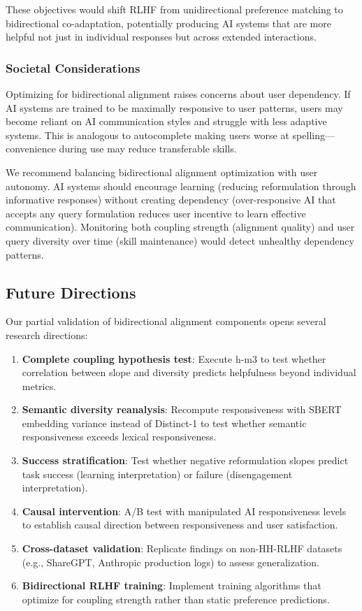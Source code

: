 These objectives would shift RLHF from unidirectional preference matching to bidirectional co-adaptation, potentially producing AI systems that are more helpful not just in individual responses but across extended interactions.

\subsubsection{Societal Considerations}

Optimizing for bidirectional alignment raises concerns about user dependency. If AI systems are trained to be maximally responsive to user patterns, users may become reliant on AI communication styles and struggle with less adaptive systems. This is analogous to autocomplete making users worse at spelling---convenience during use may reduce transferable skills.

We recommend balancing bidirectional alignment optimization with user autonomy. AI systems should encourage learning (reducing reformulation through informative responses) without creating dependency (over-responsive AI that accepts any query formulation reduces user incentive to learn effective communication). Monitoring both coupling strength (alignment quality) and user query diversity over time (skill maintenance) would detect unhealthy dependency patterns.

\subsection{Future Directions}

Our partial validation of bidirectional alignment components opens several research directions:

\begin{enumerate}
\item \textbf{Complete coupling hypothesis test}: Execute h-m3 to test whether correlation between slope and diversity predicts helpfulness beyond individual metrics.

\item \textbf{Semantic diversity reanalysis}: Recompute responsiveness with SBERT embedding variance instead of Distinct-1 to test whether semantic responsiveness exceeds lexical responsiveness.

\item \textbf{Success stratification}: Test whether negative reformulation slopes predict task success (learning interpretation) or failure (disengagement interpretation).

\item \textbf{Causal intervention}: A/B test with manipulated AI responsiveness levels to establish causal direction between responsiveness and user satisfaction.

\item \textbf{Cross-dataset validation}: Replicate findings on non-HH-RLHF datasets (e.g., ShareGPT, Anthropic production logs) to assess generalization.

\item \textbf{Bidirectional RLHF training}: Implement training algorithms that optimize for coupling strength rather than static preference predictions.
\end{enumerate}

